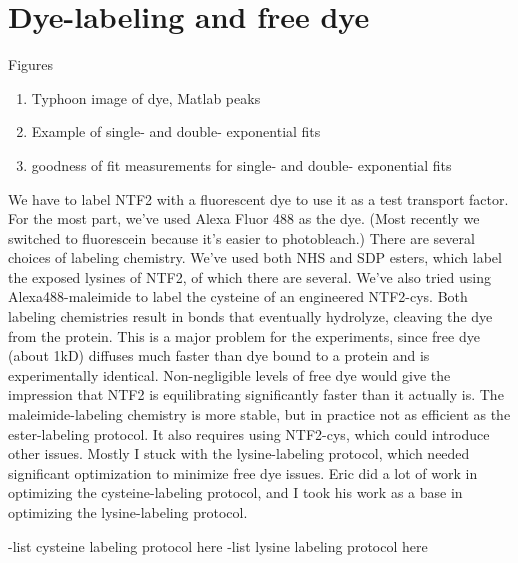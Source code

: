 \section{Dye-labeling and free dye}
Figures
\begin{enumerate}
\item Typhoon image of dye, Matlab peaks
\item Example of single- and double- exponential fits
\item goodness of fit measurements for single- and double- exponential fits
\end{enumerate}
We have to label NTF2 with a fluorescent dye to use it as a test transport factor.  For the most part, we've used Alexa Fluor 488 as the dye.  (Most recently we switched to fluorescein because it's easier to photobleach.)  There are several choices of labeling chemistry.  We've used both NHS and SDP esters, which label the exposed lysines of NTF2, of which there are several.  We've also tried using Alexa488-maleimide to label the cysteine of an engineered NTF2-cys.  Both labeling chemistries result in bonds that eventually hydrolyze, cleaving the dye from the protein.  This is a major problem for the experiments, since free dye (about 1kD) diffuses much faster than dye bound to a protein and is experimentally identical.  Non-negligible levels of free dye would give the impression that NTF2 is equilibrating significantly faster than it actually is.  The maleimide-labeling chemistry is more stable, but in practice not as efficient as the ester-labeling protocol.  It also requires using NTF2-cys, which could introduce other issues.  Mostly I stuck with the lysine-labeling protocol, which needed significant optimization to minimize free dye issues.  Eric did a lot of work in optimizing the cysteine-labeling protocol, and I took his work as a base in optimizing the lysine-labeling protocol.

-list cysteine labeling protocol here
-list lysine labeling protocol here

